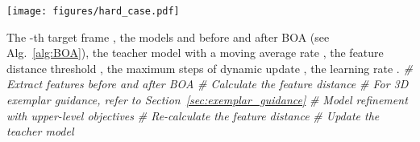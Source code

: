 \documentclass[10pt,journal,compsoc]{IEEEtran}
\makeatletter
\let\MYoriglatexcaption\caption
\renewcommand{\caption}[2][\relax]{\MYoriglatexcaption[#2]{#2}}
\DeclareRobustCommand\onedot{\futurelet\@let@token\@onedot}
\def\@onedot{\ifx\@let@token.\else.\null\fi\xspace}
\def\eg{\emph{e.g}\onedot} \def\Eg{\emph{E.g}\onedot}
\newcommand{\sect}[1]{Section~\ref{#1}}
\newcommand{\alg}[1]{Alg.~\ref{#1}}
\makeatother
\begin{document}
\begin{table}[t]
    \centering
    \caption{Comparison of different retrieval strategies. We here use Human3.6M as an example source dataset.}
    \vspace{-5pt}
    \label{tab:retrieval_compar}
\end{table}


\begin{figure*}
    \centering
    \texttt{[image: figures/hard\_case.pdf]}
    \vspace{-20pt}
    \caption{
    Performance of BOA (\alg{alg:BOA}) and DynaBOA (\alg{alg:adaptive_update}) on non-stationary streaming data, where the \textit{key-frames} correspond to the hard cases that can drastically increase the error of human mesh reconstruction, \eg, sudden movements, severe occlusions, and scene changes. Thanks to the dynamic update strategy, DynaBOA fully adapts to the hard samples while avoiding overfitting regular frames adaptively.
    }
    \label{fig:hard_case}
\end{figure*}


\begin{algorithm}[t] 
  \caption{Dynamic update strategy}  
  \label{alg:adaptive_update}  
  \small
  \begin{algorithmic}[1]
    \Require The -th target frame , the models  and  before and after BOA (see \alg{alg:BOA}), the teacher model  with a moving average rate , the feature distance threshold , the maximum steps of dynamic update , the learning rate .
    \Ensure 
\State \textit{\# Extract features before and after BOA}
    \State 
    \State \textit{\# Calculate the feature distance}
    \State 
    \State 
        \State \textit{\# For 3D exemplar guidance, refer to \sect{sec:exemplar_guidance}}
        \State 
\State \textit{\# Model refinement with upper-level objectives}
        \State 
        \State \textit{\# Re-calculate the feature distance}
        \State 
        \State 
        \State \textit{\# Update the teacher model}
        \State 
        \State 
    \EndWhile
  \end{algorithmic}  
\end{algorithm}
\end{document}

